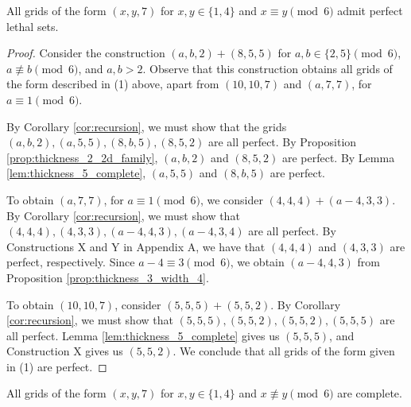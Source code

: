 \begin{lem}
\label{lem:thickness_7_case_1}
All grids of the form $(x,y,7)$ for $x,y \in \{1,4\}$ and $x \equiv y \pmod 6$ admit perfect lethal sets.
\end{lem}

\begin{proof}
Consider the construction $(a,b,2) + (8,5,5)$ for $a,b \in \{2,5\} \pmod 6$, $a \not\equiv b \pmod 6$, and $a,b > 2$. Observe that this construction obtains all grids of the form described in (1) above, apart from $(10,10,7)$ and $(a, 7,7)$, for $a \equiv 1 \pmod 6$. 

By Corollary \ref{cor:recursion}, we must show that the grids $(a,b,2), (a,5,5), (8,b,5), (8,5,2)$ are all perfect. By Proposition \ref{prop:thickness_2_2d_family}, $(a,b,2)$ and $(8,5,2)$ are perfect. By Lemma \ref{lem:thickness_5_complete}, $(a,5,5)$ and $(8,b,5)$ are perfect. 

To obtain $(a,7,7)$, for $a \equiv 1 \pmod 6$, we consider $(4,4,4) + (a-4,3,3)$. By Corollary \ref{cor:recursion}, we must show that $(4,4,4), (4,3,3), (a-4,4,3), (a-4,3,4)$ are all perfect. By Constructions X and Y in Appendix A, we have that $(4,4,4)$ and $(4,3,3)$ are perfect, respectively. Since $a-4 \equiv 3 \pmod 6$, we obtain $(a-4,4,3)$ from Proposition \ref{prop:thickness_3_width_4}.

To obtain $(10,10,7)$, consider $(5,5,5) + (5,5,2)$. By Corollary \ref{cor:recursion}, we must show that $(5,5,5), (5,5,2), (5,5,2), (5,5,5)$ are all perfect. Lemma \ref{lem:thickness_5_complete} gives us $(5,5,5)$, and Construction X gives us $(5,5,2)$. We conclude that all grids of the form given in (1) are perfect. 
\end{proof}

\begin{lem}
\label{lem:thickness_7_case_2}
All grids of the form $(x,y,7)$ for $x,y \in \{1,4\}$ and $x \not\equiv y \pmod 6$ are complete.
\end{lem}

